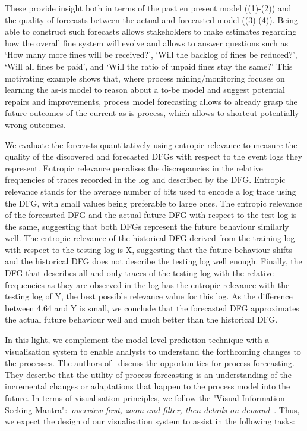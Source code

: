 These provide insight both in terms of the past en present model ((1)-(2)) and the quality of forecasts between the actual and forecasted model ((3)-(4)).
Being able to construct such forecasts allows stakeholders to make estimates regarding how the overall fine system will evolve and allows to answer questions such as `How many more fines will be received?', `Will the backlog of fines be reduced?', `Will all fines be paid', and `Will the ratio of unpaid fines stay the same?'
This motivating example shows that, where process mining/monitoring focuses on learning the as-is model to reason about a to-be model and suggest potential repairs and improvements, process model forecasting allows to already grasp the future outcomes of the current as-is process, which allows to shortcut potentially wrong outcomes. 

We evaluate the forecasts quantitatively using entropic relevance \cite{DBLP:conf/icpm/PolyvyanyyMG20} to measure the quality of the discovered and forecasted DFGs with respect to the event logs they represent. 
Entropic relevance penalises the discrepancies in the relative frequencies of traces recorded in the log and described by the DFG. Entropic relevance stands for the average number of bits used to encode a log trace using the DFG, with small values being preferable to large ones.
The entropic relevance of the forecasted DFG and the actual future DFG with respect to the test log is the same, suggesting that both DFGs represent the future behaviour similarly well. 
The entropic relevance of the historical DFG derived from the training log with respect to the testing log is X, suggesting that the future behaviour shifts and the historical DFG does not describe the testing log well enough. 
Finally, the DFG that describes all and only traces of the testing log with the relative frequencies as they are observed in the log has the entropic relevance with the testing log of Y, the best possible relevance value for this log. As the difference between 4.64 and Y is small, we conclude that the forecasted DFG approximates the actual future behaviour well and much better than the historical DFG.

In this light, we complement the model-level prediction technique with a visualisation system to enable analysts to understand the forthcoming changes to the processes. The authors of~\cite{DBLP:conf/bpm/PollPRRR18} discuss the opportunities for process forecasting. They describe that the utility of process forecasting is an understanding of the incremental changes or adaptations that happen to the process model into the future. In terms of visualisation principles, we follow the "Visual Information-Seeking Mantra":~\emph{overview first, zoom and filter, then details-on-demand}~\cite{DBLP:conf/vl/Shneiderman96}. 
Thus, we expect the design of our visualisation system to assist in the following tasks:

